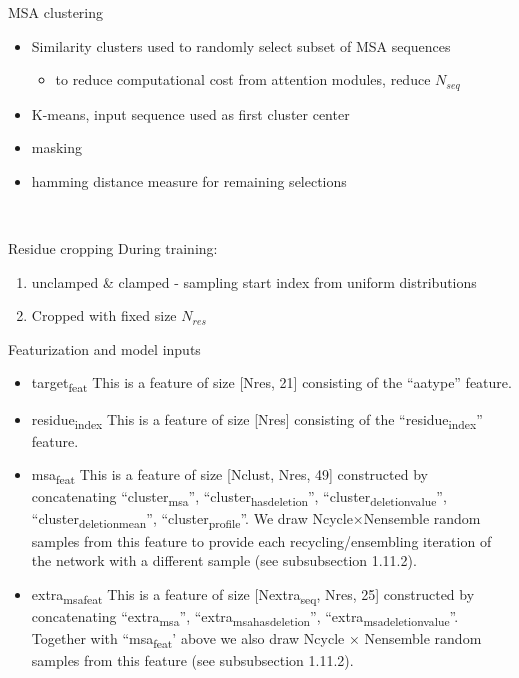 \documentclass[presentation, smaller]{beamer}
\begin{document}
\begin{frame}[label={sec:orgc99ffd7}]{MSA clustering}
\begin{itemize}
\item Similarity clusters used to randomly select subset of MSA sequences
\begin{itemize}
\item to reduce computational cost from attention modules, reduce \(N_{seq}\)
\end{itemize}

\item K-means, input sequence used as first cluster center
\item masking
\item hamming distance measure for remaining selections
\end{itemize}~\cite{jumperHighlyAccurateProtein2021}
\end{frame}

\begin{frame}[label={sec:org378f9c9}]{Residue cropping}
During training:
\begin{enumerate}
\item unclamped \& clamped - sampling start index from uniform distributions
\item Cropped with fixed size \(N_{res}\)~\cite{jumperHighlyAccurateProtein2021}
\end{enumerate}
\end{frame}

\begin{frame}[label={sec:orgdf1abfc}]{Featurization and model inputs}
\begin{itemize}
\item \alert{target\textsubscript{feat}}
This is a feature of size [Nres, 21] consisting of the “aatype” feature.
\item \alert{residue\textsubscript{index}}
This is a feature of size [Nres] consisting of the “residue\textsubscript{index}” feature.
\item \alert{msa\textsubscript{feat}}
This is a feature of size [Nclust, Nres, 49] constructed by concatenating “cluster\textsubscript{msa}”, “cluster\textsubscript{has}\textsubscript{deletion}”, “cluster\textsubscript{deletion}\textsubscript{value}”, “cluster\textsubscript{deletion}\textsubscript{mean}”, “cluster\textsubscript{profile}”. We draw Ncycle×Nensemble random samples from this feature to provide each recycling/ensembling iteration of the network with a different sample (see subsubsection 1.11.2).
\item \alert{extra\textsubscript{msa}\textsubscript{feat}}
This is a feature of size [Nextra\textsubscript{seq}, Nres, 25] constructed by concatenating “extra\textsubscript{msa}”, “extra\textsubscript{msa}\textsubscript{has}\textsubscript{deletion}”, “extra\textsubscript{msa}\textsubscript{deletion}\textsubscript{value}”. Together with “msa\textsubscript{feat}’ above we also draw Ncycle × Nensemble random samples from this feature (see subsubsection 1.11.2).~\cite{jumperHighlyAccurateProtein2021}
\end{itemize}
\end{frame}
\end{document}

